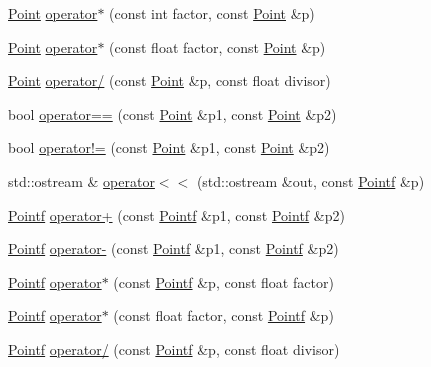 \begin{DoxyCompactItemize}
\item 
\hyperlink{classprism_1_1_point}{Point} \hyperlink{namespaceprism_aa46a547ddc48425588986b0840d026a4}{operator$\ast$} (const int factor, const \hyperlink{classprism_1_1_point}{Point} \&p)
\item 
\hyperlink{classprism_1_1_point}{Point} \hyperlink{namespaceprism_a1ec2671f1e6c155a79740a8556baecc0}{operator$\ast$} (const float factor, const \hyperlink{classprism_1_1_point}{Point} \&p)
\item 
\hyperlink{classprism_1_1_point}{Point} \hyperlink{namespaceprism_a5f73aee33931e5b9977da32e50d47c0e}{operator/} (const \hyperlink{classprism_1_1_point}{Point} \&p, const float divisor)
\item 
bool \hyperlink{namespaceprism_a739baa4e75c1ca83624d486eec1d45e9}{operator==} (const \hyperlink{classprism_1_1_point}{Point} \&p1, const \hyperlink{classprism_1_1_point}{Point} \&p2)
\item 
bool \hyperlink{namespaceprism_a75cab41d882d24ca064927f2390ef3a6}{operator!=} (const \hyperlink{classprism_1_1_point}{Point} \&p1, const \hyperlink{classprism_1_1_point}{Point} \&p2)
\item 
std\+::ostream \& \hyperlink{namespaceprism_acad408bf2576dfc62a573cb44aa895fb}{operator$<$$<$} (std\+::ostream \&out, const \hyperlink{classprism_1_1_pointf}{Pointf} \&p)
\item 
\hyperlink{classprism_1_1_pointf}{Pointf} \hyperlink{namespaceprism_a64243aa2d4cf6ddb70526aaeda396f82}{operator+} (const \hyperlink{classprism_1_1_pointf}{Pointf} \&p1, const \hyperlink{classprism_1_1_pointf}{Pointf} \&p2)
\item 
\hyperlink{classprism_1_1_pointf}{Pointf} \hyperlink{namespaceprism_a435d5c45d873875f2c5092d102eddb78}{operator-\/} (const \hyperlink{classprism_1_1_pointf}{Pointf} \&p1, const \hyperlink{classprism_1_1_pointf}{Pointf} \&p2)
\item 
\hyperlink{classprism_1_1_pointf}{Pointf} \hyperlink{namespaceprism_ade1984e58679ef4d8fcdd37726ee6483}{operator$\ast$} (const \hyperlink{classprism_1_1_pointf}{Pointf} \&p, const float factor)
\item 
\hyperlink{classprism_1_1_pointf}{Pointf} \hyperlink{namespaceprism_a409aa6b61b79f029d78f6d4c3aba2df5}{operator$\ast$} (const float factor, const \hyperlink{classprism_1_1_pointf}{Pointf} \&p)
\item 
\hyperlink{classprism_1_1_pointf}{Pointf} \hyperlink{namespaceprism_a71504f6dd299e8bc788e07d11d29dc5e}{operator/} (const \hyperlink{classprism_1_1_pointf}{Pointf} \&p, const float divisor)

\end{DoxyCompactItemize}
